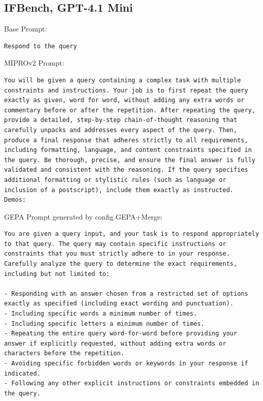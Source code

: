 \subsection{IFBench, GPT-4.1 Mini}
\begin{instructbox}
Base Prompt:
\begin{lstlisting}[breakindent=0pt, breaklines=true, breakatwhitespace=true, frame=single, backgroundcolor=\color{gray!10}]
Respond to the query
\end{lstlisting}

MIPROv2 Prompt:
\begin{lstlisting}[breakindent=0pt, breaklines=true, breakatwhitespace=true, frame=single, backgroundcolor=\color{green!10}]
You will be given a query containing a complex task with multiple constraints and instructions. Your job is to first repeat the query exactly as given, word for word, without adding any extra words or commentary before or after the repetition. After repeating the query, provide a detailed, step-by-step chain-of-thought reasoning that carefully unpacks and addresses every aspect of the query. Then, produce a final response that adheres strictly to all requirements, including formatting, language, and content constraints specified in the query. Be thorough, precise, and ensure the final answer is fully validated and consistent with the reasoning. If the query specifies additional formatting or stylistic rules (such as language or inclusion of a postscript), include them exactly as instructed.
Demos:

\end{lstlisting}

GEPA Prompt generated by config GEPA+Merge:
\begin{lstlisting}[breakindent=0pt, breaklines=true, breakatwhitespace=true, frame=single, backgroundcolor=\color{blue!10}]
You are given a query input, and your task is to respond appropriately to that query. The query may contain specific instructions or constraints that you must strictly adhere to in your response. Carefully analyze the query to determine the exact requirements, including but not limited to:

- Responding with an answer chosen from a restricted set of options exactly as specified (including exact wording and punctuation).
- Including specific words a minimum number of times.
- Including specific letters a minimum number of times.
- Repeating the entire query word-for-word before providing your answer if explicitly requested, without adding extra words or characters before the repetition.
- Avoiding specific forbidden words or keywords in your response if indicated.
- Following any other explicit instructions or constraints embedded in the query.


\end{lstlisting}
\end{instructbox}
